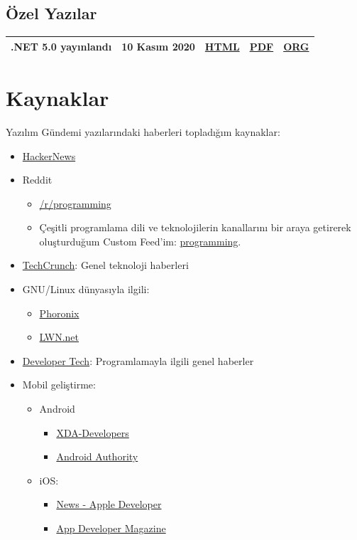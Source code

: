 \documentclass[11pt]{article}
\begin{document}
\subsection*{Özel Yazılar}
\label{sec:org4902dac}
\begin{center}
\begin{tabular}{lllll}
\hline
.NET 5.0 yayınlandı & 10 Kasım 2020 & \href{arsiv/ozel-yazilar/dotnet-5-0/dotnet-5-0.html}{HTML} & \href{arsiv/ozel-yazilar/dotnet-5-0/dotnet-5-0.pdf}{PDF} & \href{arsiv/ozel-yazilar/dotnet-5-0/dotnet-5-0.org}{ORG}\\
\hline
\end{tabular}
\end{center}
\section*{Kaynaklar}
\label{sec:orgb26d44d}
Yazılım Gündemi yazılarındaki haberleri topladığım kaynaklar:
\begin{itemize}
\item \href{https://news.ycombinator.com/news}{HackerNews}
\item Reddit
\begin{itemize}
\item \href{https://reddit.com/r/programming}{/r/programming}
\item Çeşitli programlama dili ve teknolojilerin kanallarını bir araya getirerek
oluşturduğum Custom Feed'im: \href{https://www.reddit.com/user/erenhatirnaz/m/programming/}{programming}.
\end{itemize}
\item \href{https://techcrunch.com/}{TechCrunch}: Genel teknoloji haberleri
\item GNU/Linux dünyasıyla ilgili:
\begin{itemize}
\item \href{https://www.phoronix.com}{Phoronix}
\item \href{https://lwn.net/}{LWN.net}
\end{itemize}
\item \href{https://developer-tech.com/}{Developer Tech}: Programlamayla ilgili genel haberler
\item Mobil geliştirme:
\begin{itemize}
\item Android
\begin{itemize}
\item \href{https://www.xda-developers.com/}{XDA-Developers}
\item \href{https://www.androidauthority.com/}{Android Authority}
\end{itemize}
\item iOS:
\begin{itemize}
\item \href{https://developer.apple.com/news/}{News - Apple Developer}
\item \href{https://appdevelopermagazine.com/iOS}{App Developer Magazine}
\end{itemize}
\end{itemize}
\end{itemize}
\end{document}
